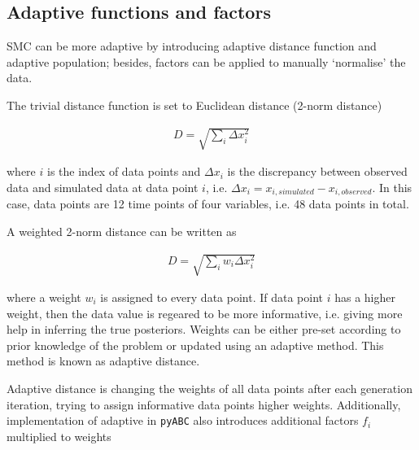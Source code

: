 





\subsection{Adaptive functions and factors}


SMC can be more adaptive by introducing adaptive distance function and adaptive population; besides, factors can be applied to manually `normalise' the data.

The trivial distance function is set to Euclidean distance (2-norm distance)

\begin{align}
    \label{eq:dis}
    D=\sqrt{\sum_i \Delta x_i^2}
\end{align}

where $i$ is the index of data points and $\Delta x_i$ is the discrepancy between  observed data and simulated data at data point $i$, i.e. $\Delta x_i = x_{i, simulated}-x_{i, observed}$. In this case, data points are 12 time points of four variables, i.e. 48 data points in total.

A weighted 2-norm distance can be written as

\begin{align}
    \label{dis_w}
    D=\sqrt{\sum_i w_i \Delta x_i^2}
\end{align}

where a weight $w_i$ is assigned to every data point. If data point $i$ has a higher weight, then the data value is regeared to be more informative, i.e. giving more help in inferring the true posteriors. Weights can be either pre-set according to prior knowledge of the problem or updated using an adaptive method. This method is known as adaptive distance.

Adaptive distance is changing the weights of all data points after each generation iteration, trying to assign informative data points higher weights. Additionally, implementation of adaptive in \verb|pyABC| also introduces additional factors $f_i$ multiplied to weights \cite{ref:adpt_dis}

